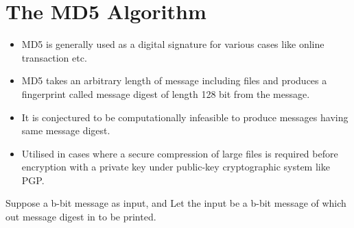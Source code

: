 \cleardoublepage
{}
{}
\chapter{The MD5 Algorithm}

\begin{itemize}
\item MD5 is generally used as a digital signature for various cases like online transaction etc.
\item MD5 takes an arbitrary length of message including files and produces a fingerprint called message digest of length 128 bit from the message.
\item It is conjectured to be computationally infeasible to produce messages having same message digest.
\item Utilised in cases where a secure compression of large files is required before encryption with a private key under public-key cryptographic system like PGP.
\end{itemize}
Suppose a b-bit message as input, and
Let the input be a b-bit message of which out message digest in to be printed.

